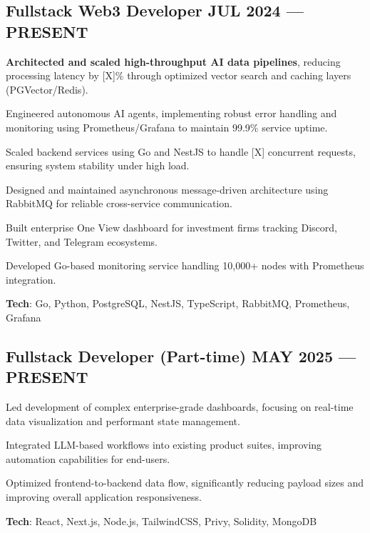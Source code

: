 \documentclass[letter,10pt]{article}
\begin{document}
\subsection{{Fullstack Web3 Developer \hfill JUL 2024 --- PRESENT}}
\begin{zitemize}
  \item \textbf{Architected and scaled high-throughput AI data pipelines}, reducing processing latency by [X]\% through optimized vector search and caching layers (PGVector/Redis).
  \item Engineered autonomous AI agents, implementing robust error handling and monitoring using Prometheus/Grafana to maintain 99.9\% service uptime.
  \item Scaled backend services using Go and NestJS to handle [X] concurrent requests, ensuring system stability under high load.
  \item Designed and maintained asynchronous message-driven architecture using RabbitMQ for reliable cross-service communication.
  \item Built enterprise One View dashboard for investment firms tracking Discord, Twitter, and Telegram ecosystems.
  \item Developed Go-based monitoring service handling 10,000+ nodes with Prometheus integration.
  \item \textbf{Tech}: Go, Python, PostgreSQL, NestJS, TypeScript, RabbitMQ, Prometheus, Grafana
\end{zitemize}

\subsection{{Fullstack Developer (Part-time) \hfill MAY 2025 --- PRESENT}}
\begin{zitemize}
  \item Led development of complex enterprise-grade dashboards, focusing on real-time data visualization and performant state management.
  \item Integrated LLM-based workflows into existing product suites, improving automation capabilities for end-users.
  \item Optimized frontend-to-backend data flow, significantly reducing payload sizes and improving overall application responsiveness.
  \item \textbf{Tech}: React, Next.js, Node.js, TailwindCSS, Privy, Solidity, MongoDB
\end{zitemize}
\end{document}
